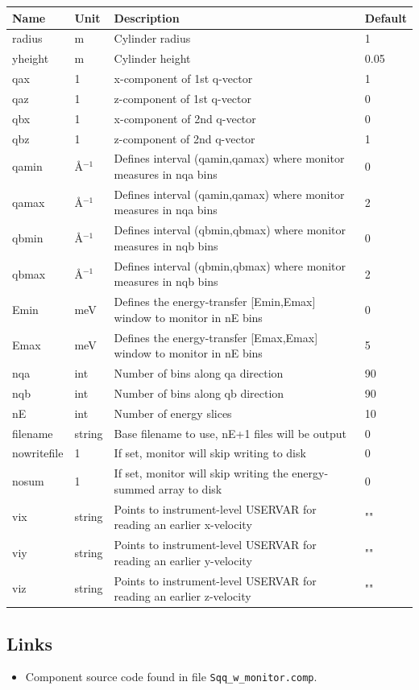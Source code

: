\begin{longtable}{p{}p{}p{}p{}}
\toprule
\textbf{Name} & \textbf{Unit} & \textbf{Description} & \textbf{Default} \\
\midrule
\endhead
radius & m & Cylinder radius & 1 \\
yheight & m & Cylinder height & 0.05 \\
qax & 1 & x-component of 1st q-vector & 1 \\
qaz & 1 & z-component of 1st q-vector & 0 \\
qbx & 1 & x-component of 2nd q-vector & 0 \\
qbz & 1 & z-component of 2nd q-vector & 1 \\
qamin & \AA{}$^{-1}$ & Defines interval (qamin,qamax) where monitor measures in nqa bins & 0 \\
qamax & \AA{}$^{-1}$ & Defines interval (qamin,qamax) where monitor measures in nqa bins & 2 \\
qbmin & \AA{}$^{-1}$ & Defines interval (qbmin,qbmax) where monitor measures in nqb bins & 0 \\
qbmax & \AA{}$^{-1}$ & Defines interval (qbmin,qbmax) where monitor measures in nqb bins & 2 \\
Emin & meV & Defines the energy-transfer [Emin,Emax] window to monitor in nE bins & 0 \\
Emax & meV & Defines the energy-transfer [Emax,Emax] window to monitor in nE bins & 5 \\
nqa & int & Number of bins along qa direction & 90 \\
nqb & int & Number of bins along qb direction & 90 \\
nE & int & Number of energy slices & 10 \\
filename & string & Base filename to use, nE+1 files will be output & 0 \\
nowritefile & 1 & If set, monitor will skip writing to disk & 0 \\
nosum & 1 & If set, monitor will skip writing the energy-summed array to disk & 0 \\
vix & string & Points to instrument-level USERVAR for reading an earlier x-velocity & "" \\
viy & string & Points to instrument-level USERVAR for reading an earlier y-velocity & "" \\
viz & string & Points to instrument-level USERVAR for reading an earlier z-velocity & "" \\
\bottomrule
\end{longtable}

\subsection*{Links}
\begin{itemize}
  \item Component source code found in file \texttt{Sqq\_w\_monitor.comp}.
\end{itemize}
